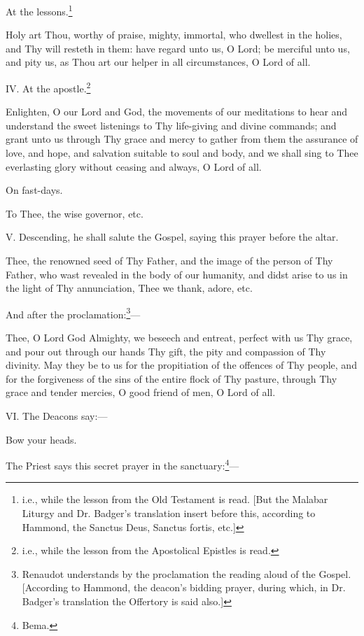 At the lessons.\footnote{\par  i.e., while the lesson from the Old Testament is read. [But the Malabar Liturgy and Dr. Badger’s translation insert before this, according to Hammond, the Sanctus Deus, Sanctus fortis, etc.]}

Holy art Thou, worthy of praise, mighty, immortal, who dwellest in the holies, and Thy will resteth in them: have regard unto us, O Lord; be merciful unto us, and pity us, as Thou art our helper in all circumstances, O Lord of all.

IV. At the apostle.\footnote{\par  i.e., while the lesson from the Apostolical Epistles is read.}

Enlighten, O our Lord and God, the movements of our meditations to hear and understand the sweet listenings to Thy life-giving and divine commands; and grant unto us through Thy grace and mercy to gather from them the assurance of love, and hope, and salvation suitable to soul and body, and we shall sing to Thee everlasting glory without ceasing and always, O Lord of all.

On fast-days.

To Thee, the wise governor, etc.

V. Descending, he shall salute the Gospel, saying this prayer before the altar.

Thee, the renowned seed of Thy Father, and the image of the person of Thy Father, who wast revealed in the body of our humanity, and didst arise to us in the light of Thy annunciation, Thee we thank, adore, etc.

And after the proclamation:\footnote{\par  Renaudot understands by the proclamation the reading aloud of the Gospel. [According to Hammond, the deacon’s bidding prayer, during which, in Dr. Badger’s translation the Offertory is said also.]}—

Thee, O Lord God Almighty, we beseech and entreat, perfect with us Thy grace, and pour out through our hands Thy gift, the pity and compassion of Thy divinity. May they be to us for the propitiation of the offences of Thy people, and for the forgiveness of the sins of the entire flock of Thy pasture, through Thy grace and tender mercies, O good friend of men, O Lord of all.

VI. The Deacons say:—

Bow your heads.

The Priest says this secret prayer in the sanctuary:\footnote{\par  Bema.}—

